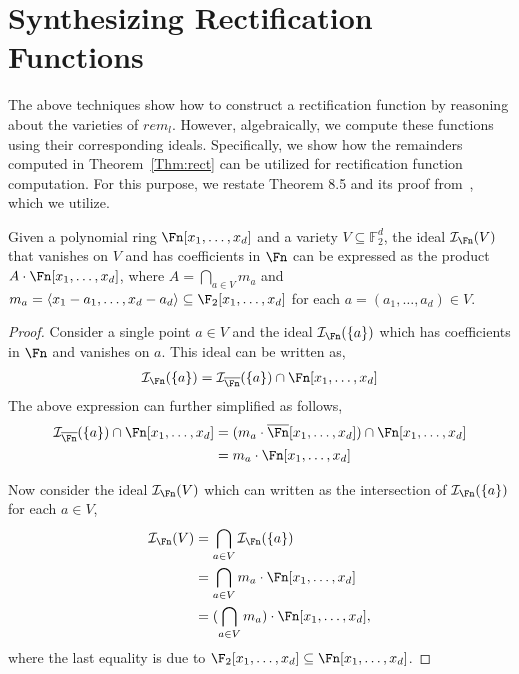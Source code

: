 \section{Synthesizing Rectification Functions}\label{comp:synth}

The above techniques show how to construct a rectification function
by reasoning about the varieties of $rem_l$.  
However, algebraically, we compute these functions using their corresponding ideals.
Specifically, we show how the remainders computed in Theorem~\ref{Thm:rect} can be utilized for rectification function computation.
For this purpose, we restate Theorem 8.5 and its proof from~\cite{UTK:thesis}, which we utilize. 


\begin{Theorem}
\label{thm:coffF2}
Given a polynomial ring $\Fn[x_1,\dots,x_d]$ and a variety $V \subseteq \mathbb{F}_2^d$,
the ideal $\mathcal{I}_{\Fn}(V)$ that vanishes on $V$ and has coefficients in $\Fn$ 
can be expressed as the product $A \cdot\Fn[x_1,\ldots,x_d]$, where $A = \bigcap_{a\in V}m_a$
and $m_a = \langle x_1-a_1,\dots,x_d-a_d \rangle \subseteq \F_2[x_1, \ldots, x_d]$ for 
each $a=(a_1,\dots,a_d) \in V$.
\end{Theorem}

\begin{proof}
Consider a single point $a \in V$ and the ideal $\mathcal{I}_{\Fn}(\{a\})$ which has coefficients in 
$\Fn$ and vanishes on $a$. This ideal can be written as,
\begin{align*}
\mathcal{I}_{\Fn}(\{a\})=\mathcal{I}_{\overline{\Fn}}(\{a\})\cap\Fn[x_1,\dots,x_d]
\end{align*}
The above expression can further simplified as follows,
\begin{align*}
\mathcal{I}_{\overline{\Fn}}(\{a\})\cap \Fn[x_1,\ldots,x_d] 
&= (m_a\cdot \overline{\Fn}[x_1,\ldots,x_d])\cap\Fn[x_1,\ldots,x_d] \\
&= m_a\cdot \Fn[x_1,\ldots,x_d]
\end{align*}

Now consider the ideal $\mathcal{I}_{\Fn}(V)$ which can written as the intersection of 
$\mathcal{I}_{\Fn}(\{a\})$ for each $a \in V$,
\begin{align*}
\mathcal{I}_{\Fn}(V) &= \bigcap_{a\in V}\mathcal{I}_{\Fn}(\{a\}) \\
&= \bigcap_{a\in V}m_a\cdot \Fn[x_1,\ldots,x_d] \\
&= (\bigcap_{a\in V}m_a)\cdot \Fn[x_1,\ldots,x_d],
\end{align*}
where the last equality is due to $\F_2[x_1,\ldots,x_d] \subseteq \Fn[x_1,\ldots,x_d]$.
\end{proof}

